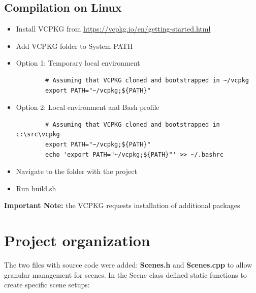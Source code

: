 \documentclass[12pt,a4paper,english]{article}
\begin{document}
\subsection{Compilation on Linux}

\begin{itemize}
    \item Install VCPKG from \url{https://vcpkg.io/en/getting-started.html}
    \item Add VCPKG folder to System PATH
    \item Option 1: Temporary local environment
          \begin{verbatim}
        # Assuming that VCPKG cloned and bootstrapped in ~/vcpkg
        export PATH="~/vcpkg;${PATH}"
    \end{verbatim}

    \item Option 2: Local environment and Bash profile
          \begin{verbatim}
        # Assuming that VCPKG cloned and bootstrapped in c:\src\vcpkg
        export PATH="~/vcpkg;${PATH}"
        echo 'export PATH="~/vcpkg;${PATH}"' >> ~/.bashrc
    \end{verbatim}

    \item Navigate to the folder with the project
    \item Run build.sh
\end{itemize}
\textbf{Important Note:} the VCPKG requests installation of additional packages

\section{Project organization}

The two files with source code were added: \textbf{Scenes.h} and \textbf{Scenes.cpp} to allow granular management for scenes.
In the Scene class defined static functions to create specific scene setups:
\end{document}
